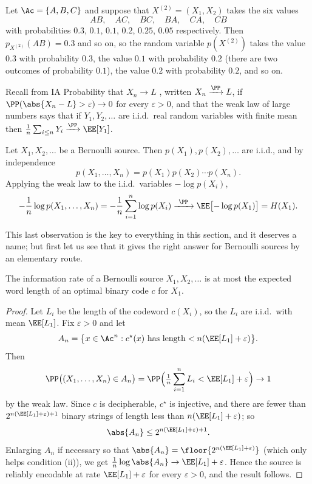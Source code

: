 \begin{example}
	Let $\Ac = \{A,B,C\}$ and suppose that $X^{(2)} = (X_1,X_2)$ takes the six values
	$$AB,\quad AC,\quad BC,\quad BA,\quad CA,\quad CB$$
	with probabilities $0.3$, $0.1$, $0.1$, $0.2$, $0.25$, $0.05$ respectively. Then $p_{X^{(2)}}(AB) = 0.3$ and so on, so the random variable $p(X^{(2)})$ takes the value $0.3$ with probability $0.3$, the value $0.1$ with probability $0.2$ (there are two outcomes of probability $0.1$), the value $0.2$ with probability $0.2$, and so on.
\end{example}

Recall from IA Probability that $X_n \to L$ , written $X_n \xrightarrow{\PP} L$, if $\PP(\abs{X_n - L} > \varepsilon) \to 0$ for every $\varepsilon > 0$, and that the weak law of large numbers says that if $Y_1, Y_2, \dots$ are i.i.d.\ real random variables with finite mean then $\frac1n \sum_{i \le n} Y_i \xrightarrow{\PP} \EE[Y_1]$.

\begin{example}\label{ex:bernoulliaep}
	Let $X_1, X_2, \dots$ be a Bernoulli source. Then $p(X_1), p(X_2), \dots$ are i.i.d., and by independence
	$$p(X_1, \dots, X_n) = p(X_1)p(X_2)\cdots p(X_n).$$
	Applying the weak law to the i.i.d.\ variables $-\log p(X_i)$,
	$$-\frac1n \log p(X_1,\dots,X_n) = -\frac1n \sum_{i=1}^n \log p(X_i) \xrightarrow{\ \PP\ } \EE\bigl[-\log p(X_1)\bigr] = H(X_1).$$
\end{example}

This last observation is the key to everything in this section, and it deserves a name; but first let us see that it gives the right answer for Bernoulli sources by an elementary route.

\begin{lemma}\label{lem:ratebound}
	The information rate of a Bernoulli source $X_1, X_2, \dots$ is at most the expected word length of an optimal binary code $c$ for $X_1$.
\end{lemma}

\begin{proof}
	Let $L_i$ be the length of the codeword $c(X_i)$, so the $L_i$ are i.i.d.\ with mean $\EE[L_1]$. Fix $\varepsilon>0$ and let
	$$A_n = \bigl\{x \in \Ac^n : c^\star(x) \text{ has length} < n(\EE[L_1]+\varepsilon)\bigr\}.$$
	Then
	$$\PP\bigl((X_1,\dots,X_n) \in A_n\bigr) = \PP\Bigl(\tfrac1n\sum_{i=1}^n L_i < \EE[L_1]+\varepsilon\Bigr) \to 1$$
	by the weak law. Since $c$ is decipherable, $c^\star$ is injective, and there are fewer than $2^{n(\EE[L_1]+\varepsilon)+1}$ binary strings of length less than $n(\EE[L_1]+\varepsilon)$; so
	$$\abs{A_n} \le 2^{n(\EE[L_1]+\varepsilon)+1}.$$
	Enlarging $A_n$ if necessary so that $\abs{A_n} = \floor{2^{n(\EE[L_1]+\varepsilon)}}$ (which only helps condition (ii)), we get $\frac1n\log\abs{A_n}\to \EE[L_1]+\varepsilon$. Hence the source is reliably encodable at rate $\EE[L_1]+\varepsilon$ for every $\varepsilon>0$, and the result follows.
\end{proof}

